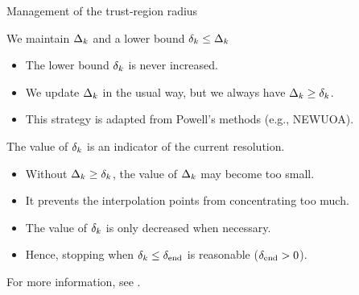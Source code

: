 \documentclass[
]{talk}
\newcommand*{\rad}[1][]{\Delta\ifblank{#1}{}{_{#1}}}
\newcommand*{\radlb}[1][]{\delta\ifblank{#1}{}{_{#1}}}
\begin{document}
\begin{frame}{Management of the trust-region radius}
    \begin{block}{We maintain $\rad[k]$ and a lower bound $\radlb[k] \le \rad[k]$}
        \begin{itemize}
            \item The lower bound $\radlb[k]$ is \alert{never} increased.
            \item We update $\rad[k]$ in the usual way, but we \alert{always} have $\rad[k] \ge \radlb[k]$.
            \item This strategy is adapted from \alert{Powell}'s methods (e.g., NEWUOA).
        \end{itemize}
    \end{block}

    The value of $\radlb[k]$ is an indicator of the current \alert{resolution}.

    \begin{itemize}
        \item Without $\rad[k] \ge \radlb[k]$, the value of $\rad[k]$ may become too small.
        \item It prevents the interpolation points from \alert{concentrating} too much.
        \item The value of $\radlb[k]$ is only \alert{decreased} when necessary.
        \item Hence, stopping when $\radlb[k] \le \radlb[\textrm{end}]$ is \alert{reasonable} ($\radlb[\textrm{end}] > 0$).
    \end{itemize}

    \medskip

    For more information, see \textcite[\S\ 5.2.5]{Ragonneau_2022}.
\end{frame}
\end{document}
